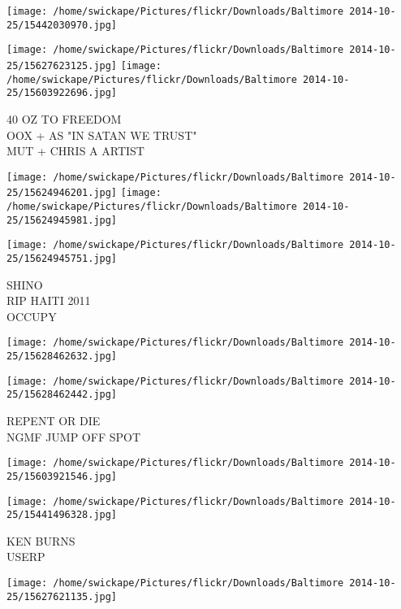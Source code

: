 \documentclass[10pt,letterpaper]{article}
\begin{document}
\texttt{[image: /home/swickape/Pictures/flickr/Downloads/Baltimore 2014-10-25/15442030970.jpg]}

\vspace{0.25in}
\texttt{[image: /home/swickape/Pictures/flickr/Downloads/Baltimore 2014-10-25/15627623125.jpg]}
\texttt{[image: /home/swickape/Pictures/flickr/Downloads/Baltimore 2014-10-25/15603922696.jpg]}

40 OZ TO FREEDOM\\
OOX + AS "IN SATAN WE TRUST"\\
MUT + CHRIS A ARTIST\\
\pagebreak

\texttt{[image: /home/swickape/Pictures/flickr/Downloads/Baltimore 2014-10-25/15624946201.jpg]}
\texttt{[image: /home/swickape/Pictures/flickr/Downloads/Baltimore 2014-10-25/15624945981.jpg]}

\vspace{0.25in}
\texttt{[image: /home/swickape/Pictures/flickr/Downloads/Baltimore 2014-10-25/15624945751.jpg]}

SHINO\\
RIP HAITI 2011\\
OCCUPY\\
\pagebreak

\texttt{[image: /home/swickape/Pictures/flickr/Downloads/Baltimore 2014-10-25/15628462632.jpg]}

\vspace{0.25in}
\texttt{[image: /home/swickape/Pictures/flickr/Downloads/Baltimore 2014-10-25/15628462442.jpg]}

REPENT OR DIE\\
NGMF JUMP OFF SPOT\\
\pagebreak

\texttt{[image: /home/swickape/Pictures/flickr/Downloads/Baltimore 2014-10-25/15603921546.jpg]}

\vspace{0.25in}
\texttt{[image: /home/swickape/Pictures/flickr/Downloads/Baltimore 2014-10-25/15441496328.jpg]}

KEN BURNS\\
USERP\\
\pagebreak

\texttt{[image: /home/swickape/Pictures/flickr/Downloads/Baltimore 2014-10-25/15627621135.jpg]}
\end{document}
